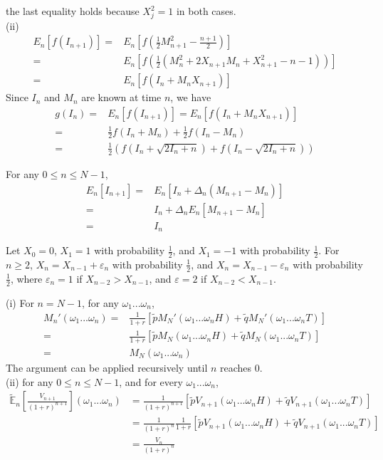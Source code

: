 \documentclass[12pt]{article}
\newenvironment{problem}[2][Problem]{\begin{trivlist}
		\item[\hskip \labelsep {\bfseries #1}\hskip \labelsep {\bfseries #2.}]}{\end{trivlist}}
\begin{document}
	the last equality holds because $X_j^2 = 1$ in both cases. \\
	(ii) 
	\begin{align*}
	E_n[f(I_{n+1})] =& E_n\left[f\left(\frac{1}{2}M_{n+1}^2-\frac{n+1}{2}\right)\right]\\
	=&E_n\left[f\left(\frac{1}{2}(M_n^2+2X_{n+1}M_n+X_{n+1}^2-n-1)\right)\right]\\
	=&E_n\left[f(I_n+M_nX_{n+1})\right]
	\end{align*}
	Since $I_n$ and $M_n$ are known at time $n$, we have
	\begin{align*}g(I_n) = &E_n[f(I_{n+1})] = E_n[f(I_n+M_nX_{n+1})]\\=&\frac{1}{2}f(I_n+M_n)+\frac{1}{2}f(I_n-M_n)\\=&\frac{1}{2}\left(f(I_n+\sqrt{2I_n+n})+f(I_n-\sqrt{2I_n+n})\right)\end{align*}
	\begin{problem}{6}\end{problem}
	For any $0\le n\le N-1$, 
	\begin{align*}
	E_n[I_{n+1}]=&E_n[I_n+\Delta_n(M_{n+1}-M_n)]\\
		=&I_n+\Delta_n E_n[M_{n+1}-M_n]\\
		=&I_n
	\end{align*}
	\begin{problem}{7}\end{problem}
	Let $X_0=0$, $X_1=1$ with probability $\frac{1}{2}$, and $X_1=-1$ with probability $\frac{1}{2}$. For $n\ge2$, $X_n = X_{n-1}+\varepsilon_n$ with probability $\frac{1}{2}$, and $X_n=X_{n-1}-\varepsilon_n$ with probability $\frac{1}{2}$, where $\varepsilon_n = 1$ if $X_{n-2}>X_{n-1}$, and $\varepsilon=2$ if $X_{n-2}<X_{n-1}$. 
	\begin{problem}{8}\end{problem}
	(i) For $n=N-1$, for any $\omega_1...\omega_n$, 
	\begin{align*}M_n'(\omega_1...\omega_n) =& \frac{1}{1+r}[\tilde{p}M_N'(\omega_1...\omega_nH)+\tilde{q}M_N'(\omega_1...\omega_nT)]\\
	=&\frac{1}{1+r}[\tilde{p}M_N(\omega_1...\omega_nH)+\tilde{q}M_N(\omega_1...\omega_nT)]\\
	=&M_N(\omega_1...\omega_n)\end{align*}
	The argument can be applied recursively until $n$ reaches $0$. \\
	(ii) for any $0\le n\le N-1$, and for every $\omega_1...\omega_n$, 
	\begin{align*}
	\tilde{\mathbb{E}}_n\left[\frac{V_{n+1}}{(1+r)^{n+1}}\right](\omega_1...\omega_n) &= \frac{1}{(1+r)^{n+1}}[\tilde{p}V_{n+1}(\omega_1...\omega_nH)+\tilde{q}V_{n+1}(\omega_1...\omega_nT)]\\
	&=\frac{1}{(1+r)^n}\frac{1}{1+r}[\tilde{p}V_{n+1}(\omega_1...\omega_nH)+\tilde{q}V_{n+1}(\omega_1...\omega_nT)]\\
	&=\frac{V_n}{(1+r)^n}
	\end{align*}
\end{document}
